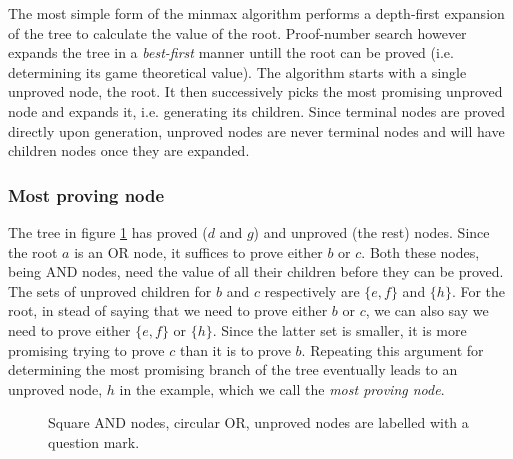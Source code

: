 \documentclass{article}
\begin{document}
The most simple form of the minmax algorithm performs a depth-first expansion of the tree to calculate the value of the root. Proof-number search however
expands the tree in a \textit{best-first} manner untill the root can be proved (i.e. determining its game theoretical value). The algorithm starts with a single
unproved node, the root. It then successively picks the most promising unproved node and expands it, i.e. generating its children. Since terminal nodes are proved
directly upon generation, unproved nodes are never terminal nodes and will have children nodes once they are expanded. 

\subsubsection*{Most proving node}
The tree in figure \ref{tree:pnex} has proved ($d$ and $g$) and unproved (the rest) nodes. Since the root $a$ is an OR node, it suffices
to prove either $b$ or $c$. Both these nodes, being AND nodes, need the value of all their children before they can be proved. The sets of
unproved children for $b$ and $c$ respectively are $\{e, f\}$ and $\{h\}$. For the root, in stead of saying that we need to prove
either $b$ or $c$, we can also say we need to prove either $\{e, f\}$ or $\{h\}$. Since the latter set is smaller, it is more
promising trying to prove $c$ than it is to prove $b$. Repeating this argument for determining the most promising branch of the tree
eventually leads to an unproved node, $h$ in the example, which we call the \textit{most proving node}.

\begin{figure}[h]
\center
{}
\caption{Square AND nodes, circular OR, unproved nodes are labelled with a question mark.}
\label{tree:pnex}
\end{figure}
\end{document}
